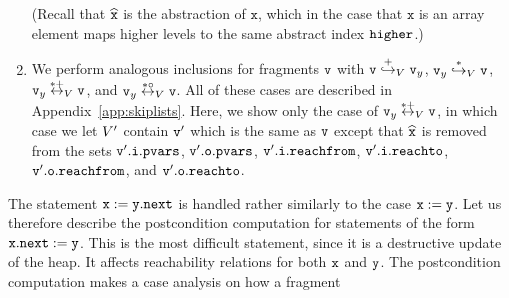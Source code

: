 \begin{enumerate}
\begin{itemize}
\end{itemize}
  (Recall that $\widehat{\mathtt{x}}$ is the abstraction of $\mathtt{x}$, which
  in the case that $\mathtt{x}$ is an array element
  maps higher levels to the same   abstract index $\tt higher$.)
\item We perform analogous inclusions for fragments $\mathtt{v}$ with
  $\mathtt{v} \overset{+}\hookrightarrow_{V} \mathtt{v}_y$,
  $\mathtt{v}_y \overset{*}\hookrightarrow_{V} \mathtt{v}$,
  $\mathtt{v}_y \overset{*+}\leftrightarrow_{V} \mathtt{v}$, and
  $\mathtt{v}_y \overset{*\circ}\leftrightarrow_{V} \mathtt{v}$. All of these
  cases are described in Appendix~\ref{app:skiplists}.
Here,
  we show only the case of $\mathtt{v}_y \overset{*+}\leftrightarrow_{V} \mathtt{v}$,
  in which case we let $V'$ contain $\mathtt{v}'$ which is the same as $\mathtt{v}$ except that $\widehat{\mathtt{x}}$ is removed from the sets
$\mathtt{v}'.\mathtt{i}.\mathtt{pvars}$,
$\mathtt{v}'.\mathtt{o}.\mathtt{pvars}$,
$\mathtt{v}'.\mathtt{i}.\mathtt{reachfrom}$,
$\mathtt{v}'.\mathtt{i}.\mathtt{reachto}$,
$\mathtt{v}'.\mathtt{o}.\mathtt{reachfrom}$, and
$\mathtt{v}'.\mathtt{o}.\mathtt{reachto}$.
\end{enumerate}
The statement ${\tt x := y.next}$ is handled rather similarly to the 
case ${\tt x := y}$.
Let us therefore describe the postcondition computation for statements of the form
${\tt x.next:= y}$.
This is the most difficult statement, since it is a destructive update of the heap. It affects reachability relations for both $\mathtt{x}$ and $\mathtt{y}$.
The postcondition computation makes a case analysis on how a fragment
